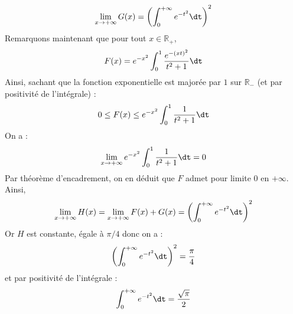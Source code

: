 \documentclass[a4paper,10pt]{report}
\begin{document}
\begin{enumerate}
$$ \lim_{x \rightarrow + \infty} G(x) = \left( \int_{0}^{+ \infty} e^{-t^2} \dt \right)^2$$
Remarquons maintenant que pour tout $x \in \mathbb{R}_+$,
$$ F(x) = e^{-x^2} \int_{0}^1 \frac{e^{-(xt)^2}}{t^2+1} \dt $$
Ainsi, sachant que la fonction exponentielle est majorée par $1$ sur $\mathbb{R}_{-}$ (et par positivité de l'intégrale) :
$$ 0 \leq F(x)   \leq e^{-x^2} \int_{0}^1 \frac{1}{t^2+1} \dt $$
On a :
$$ \lim_{x \rightarrow + \infty} e^{-x^2} \int_{0}^1 \frac{1}{t^2+1} \dt = 0$$
Par théorème d'encadrement, on en déduit que $F$ admet pour limite $0$ en $+ \infty$. Ainsi,
$$ \lim_{x \rightarrow + \infty} H(x) = \lim_{x \rightarrow + \infty} F(x) + G(x) =  \left( \int_{0}^{+ \infty} e^{-t^2} \dt \right)^2$$
Or $H$ est constante, égale à $\pi/4$ donc on a :
$$ \left( \int_{0}^{+ \infty} e^{-t^2} \dt \right)^2 = \dfrac{\pi}{4}$$
et par positivité de l'intégrale :
$$  \int_{0}^{+ \infty} e^{-t^2} \dt  = \dfrac{\sqrt{\pi}}{2}$$
\end{enumerate}




%
%
%
\end{document}
